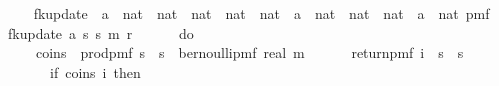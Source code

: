 \begin{isabellebody}
\ \ \ \ {\isacharparenright}{\kern0pt}{\isachardoublequoteclose}\isanewline
\isanewline
{}\isamarkupfalse%
\ fk{\isacharunderscore}{\kern0pt}update{\isacharprime}{\kern0pt}\ {\isacharcolon}{\kern0pt}{\isacharcolon}{\kern0pt}\ {\isachardoublequoteopen}{\isacharprime}{\kern0pt}a\ {\isasymRightarrow}\ nat\ {\isasymRightarrow}\ nat\ {\isasymRightarrow}\ nat\ {\isasymRightarrow}\ {\isacharparenleft}{\kern0pt}nat\ {\isasymtimes}\ nat\ {\isasymRightarrow}\ {\isacharparenleft}{\kern0pt}{\isacharprime}{\kern0pt}a\ {\isasymtimes}\ nat{\isacharparenright}{\kern0pt}{\isacharparenright}{\kern0pt}\ {\isasymRightarrow}\ {\isacharparenleft}{\kern0pt}nat\ {\isasymtimes}\ nat\ {\isasymRightarrow}\ {\isacharparenleft}{\kern0pt}{\isacharprime}{\kern0pt}a\ {\isasymtimes}\ nat{\isacharparenright}{\kern0pt}{\isacharparenright}{\kern0pt}\ pmf{\isachardoublequoteclose}\ \isanewline
\ \ {\isachardoublequoteopen}fk{\isacharunderscore}{\kern0pt}update{\isacharprime}{\kern0pt}\ a\ s\ s\ m\ r\ {\isacharequal}{\kern0pt}\ \isanewline
\ \ \ \ do\ {\isacharbraceleft}{\kern0pt}\isanewline
\ \ \ \ \ \ coins\ {\isasymleftarrow}\ prod{\isacharunderscore}{\kern0pt}pmf\ {\isacharparenleft}{\kern0pt}{\isacharbraceleft}{\kern0pt}{}{\isachardot}{\kern0pt}{\isachardot}{\kern0pt}{\isacharless}{\kern0pt}s\ {\isasymtimes}\ {\isacharbraceleft}{\kern0pt}{}{\isachardot}{\kern0pt}{\isachardot}{\kern0pt}{\isacharless}{\kern0pt}s\ {\isacharparenleft}{\kern0pt}{\isasymlambda}{\isacharunderscore}{\kern0pt}{\isachardot}{\kern0pt}\ bernoulli{\isacharunderscore}{\kern0pt}pmf\ {\isacharparenleft}{\kern0pt}{}{\isacharslash}{\kern0pt}{\isacharparenleft}{\kern0pt}real\ m{\isacharplus}{\kern0pt}{}{\isacharparenright}{\kern0pt}{\isacharparenright}{\kern0pt}{\isacharparenright}{\kern0pt}{\isacharsemicolon}{\kern0pt}\isanewline
\ \ \ \ \ \ return{\isacharunderscore}{\kern0pt}pmf\ {\isacharparenleft}{\kern0pt}{\isasymlambda}i\ {\isasymin}\ {\isacharbraceleft}{\kern0pt}{}{\isachardot}{\kern0pt}{\isachardot}{\kern0pt}{\isacharless}{\kern0pt}s\ {\isasymtimes}\ {\isacharbraceleft}{\kern0pt}{}{\isachardot}{\kern0pt}{\isachardot}{\kern0pt}{\isacharless}{\kern0pt}s\ \isanewline
\ \ \ \ \ \ \ \ if\ coins\ i\ then\ \isanewline

\end{isabellebody}
